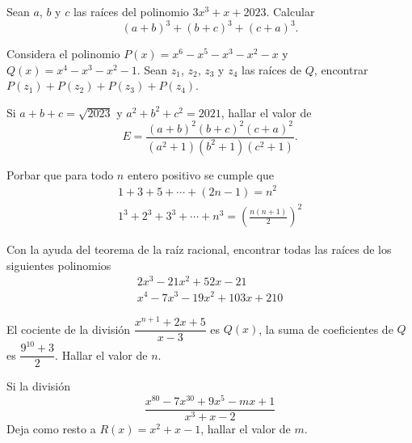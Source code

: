 \begin{section-problem}
    Sean $a$, $b$ y $c$ las raíces del polinomio $3x^3 + x + 2023$.
    Calcular \[(a + b)^3 + (b + c)^3 + (c + a)^3.\]
\end{section-problem}

\begin{section-problem}
    Considera el polinomio $P(x) = x^6 - x^5 - x^3 - x^2 - x$ y $Q(x) = x^4 - x^3 - x^2 - 1$.
    Sean $z_1$, $z_2$, $z_3$ y $z_4$ las raíces de $Q$, encontrar $P(z_1) + P(z_2) + P(z_3) + P(z_4)$.
\end{section-problem}



\begin{section-problem}
    Si $a + b + c = \sqrt{2023}$ y $a^2 + b^2 + c^2 = 2021$, hallar el valor de
    \[E = \frac{(a + b)^2 (b + c)^2 (c + a)^2}{(a^2 + 1) (b^2 + 1) (c^2 + 1)}.\]
\end{section-problem}

\begin{section-problem}
    Porbar que para todo $n$ entero positivo se cumple que
    \begin{gather*}
        1 + 3 + 5 + \cdots + \left(2n - 1\right) = n^2\\
        1^3 + 2^3 + 3^3  + \cdots + n^3 = \left(\frac{n (n + 1)}{2}\right)^2
    \end{gather*}
\end{section-problem}

\begin{section-problem}
    Con la ayuda del teorema de la raíz racional, encontrar todas las raíces de los siguientes polinomios
    \begin{gather*}
        2 x^3 - 21 x^2 + 52 x - 21 \\
        x^4 - 7 x^3 - 19 x^2 + 103 x + 210
    \end{gather*}
\end{section-problem}

\begin{section-problem}
    El cociente de la división $\dfrac{x^{n + 1} + 2x + 5}{x - 3}$ es $Q(x)$, la suma de coeficientes de $Q$ es $\dfrac{9^{10} + 3}{2}$.
    Hallar el valor de $n$.
\end{section-problem}

\begin{section-problem}
    Si la división
    \[\frac{x^{80} - 7 x^{30} + 9x^5 - mx + 1}{x^3 + x - 2}\]
    Deja como resto a $R(x) = x^2 + x - 1$, hallar el valor de $m$.
\end{section-problem}

